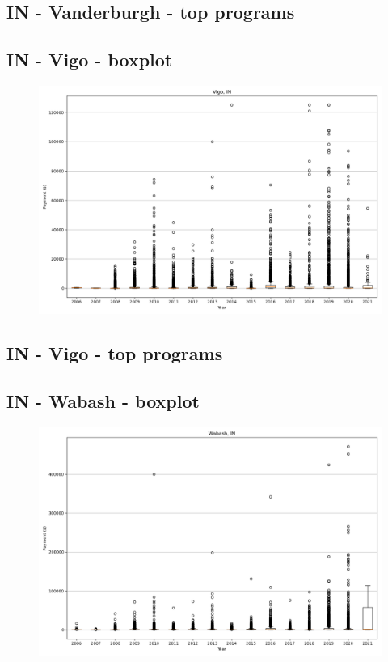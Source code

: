 \subsection*{IN - Vanderburgh - top programs}

\newpage
\subsection*{IN - Vigo - boxplot}
\begin{figure}[h]
\centering
\includegraphics[width=7in]{../output/boxplots/counties/Vigo-IN_boxplot.png}
\end{figure}


\subsection*{IN - Vigo - top programs}

\newpage
\subsection*{IN - Wabash - boxplot}
\begin{figure}[h]
\centering
\includegraphics[width=7in]{../output/boxplots/counties/Wabash-IN_boxplot.png}
\end{figure}


